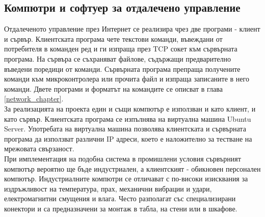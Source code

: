 \subsection{Компютри и софтуер за отдалечено управление}
Отдалеченото управление през Интернет се реализира чрез две програми - клиент и сървър. Клиентската програма чете текстови команди, въвеждани от потребителя в команден ред и ги изпраща през TCP сокет към сървърната програма. На сървъра се съхраняват файлове, съдържащи предварително въведени поредици от команди. Сървърната програма препраща получените команди към микроконтролера или прочита файл и изпраща записаните в него команди. Двете програми и форматът на командите се описват в глава \ref{network_chapter}.\\
\indent{}
За реализацията на проекта един и същи компютър е използван и като клиент, и като сървър. Клиентската програма се изпълнява на виртуална машина Ubuntu Server. Употребата на виртуална машина позволява клиентската и сървърната програма да използват различни IP адреси, което е наложително за тестване на мрежовата свързаност.\\
\indent{}
При имплементация на подобна система в промишлени условия сървърният компютър вероятно ще бъде индустриален, а клиентският - обикновен персонален компютър. Индустриалните компютри се отличават с по-високи изисквания за издръжливост на температура, прах, механични вибрации и удари, електромагнитни смущения и влага. Често разполагат със специализирани конектори и са предназначени за монтаж в табла, на стени или в шкафове.
